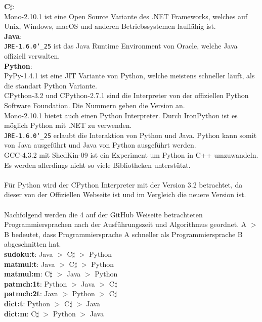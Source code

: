 \documentclass[ngerman]{article}
\begin{document}
    \textbf{C$\sharp$}:\\
    Mono-2.10.1 ist eine Open Source Variante des .NET Frameworks, welches auf Unix, Windows, macOS und anderen Betriebssystemen lauffähig ist. \cite{MonoCSharp}\\
    \textbf{Java}:\\
    \texttt{JRE-1.6.0\char`_25} ist das Java Runtime Environment von Oracle, welche Java offiziell verwalten. \cite{JREJava}\\
    \textbf{Python}:\\
    PyPy-1.4.1 ist eine JIT Variante von Python, welche meistens schneller läuft, als die standart Python Variante. \cite{PythonPyPy}\\
    CPython-3.2 und CPython-2.7.1 sind die Interpreter von der offiziellen Python Software Foundation. Die Nummern geben die Version an. \cite{CPython}\\
    Mono-2.10.1 bietet auch einen Python Interpreter. Durch IronPython ist es möglich Python mit .NET zu verwenden. \cite{IronPython}\\
    \texttt{JRE-1.6.0\char`_25} erlaubt die Interaktion von Python und Java. Python kann somit von Java ausgeführt und Java von Python ausgeführt werden. \cite{Jython}\\
    GCC-4.3.2 mit ShedKin-09 ist ein Experiment um Python in C++ umzuwandeln. Es werden allerdings nicht so viele Bibliotheken unterstützt. \cite{ShedSkin}\\\\
    Für Python wird der CPython Interpreter mit der Version 3.2 betrachtet, da dieser von der Offiziellen Webseite ist und im Vergleich die neuere Version ist.\\\\
    Nachfolgend werden die 4 auf der GitHub Weiseite betrachteten Programmiersprachen nach der Ausführungszeit und Algorithmus geordnet. A $>$ B bedeutet, dass Programmiersprache A schneller als Programmiersprache B abgeschnitten hat.\\
    \textbf{sudoku:t}: Java $>$ C$\sharp$ $>$ Python\\
    \textbf{matmul:t}: Java $>$ C$\sharp$ $>$ Python\\
    \textbf{matmul:m}: C$\sharp$ $>$ Java $>$ Python\\
    \textbf{patmch:1t}: Python $>$ Java $>$ C$\sharp$\\
    \textbf{patmch:2t}: Java $>$ Python $>$ C$\sharp$\\
    \textbf{dict:t}: Python $>$ C$\sharp$ $>$ Java\\
    \textbf{dict:m}: C$\sharp$ $>$ Python $>$ Java
\end{document}
